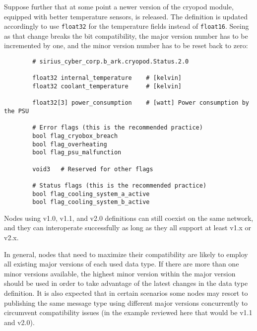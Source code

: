 \begin{remark}[breakable]
    Suppose further that at some point a newer version of the cryopod module,
    equipped with better temperature sensors, is released.
    The definition is updated accordingly to use \verb|float32| for the temperature fields instead of \verb|float16|.
    Seeing as that change breaks the bit compatibility,
    the major version number has to be incremented by one,
    and the minor version number has to be reset back to zero:

    \begin{verbatim}
        # sirius_cyber_corp.b_ark.cryopod.Status.2.0

        float32 internal_temperature    # [kelvin]
        float32 coolant_temperature     # [kelvin]

        float32[3] power_consumption    # [watt] Power consumption by the PSU

        # Error flags (this is the recommended practice)
        bool flag_cryobox_breach
        bool flag_overheating
        bool flag_psu_malfunction

        void3   # Reserved for other flags

        # Status flags (this is the recommended practice)
        bool flag_cooling_system_a_active
        bool flag_cooling_system_b_active
    \end{verbatim}

    Nodes using v1.0, v1.1, and v2.0 definitions can still coexist on the same network,
    and they can interoperate successfully as long as they all support at least v1.x or v2.x.

    In general, nodes that need to maximize their compatibility are likely to employ all existing major versions of
    each used data type.
    If there are more than one minor versions available, the highest minor version within the major version should
    be used in order to take advantage of the latest changes in the data type definition.
    It is also expected that in certain scenarios some nodes may resort to publishing the same message type
    using different major versions concurrently to circumvent compatibility issues
    (in the example reviewed here that would be v1.1 and v2.0).
\end{remark}
